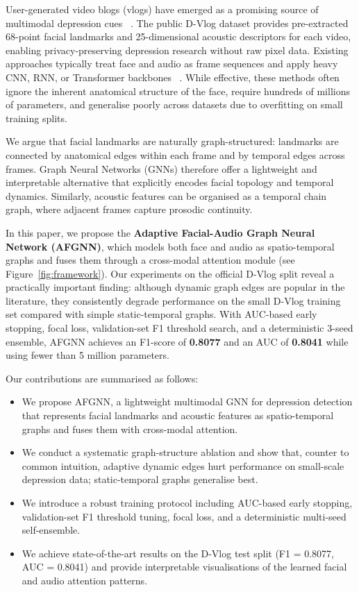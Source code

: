 \documentclass[conference]{IEEEtran}
\begin{document}
User-generated video blogs (vlogs) have emerged as a promising source of multimodal depression cues~
\cite{yoon2022dvlog}.
The public D-Vlog dataset provides pre-extracted 68-point facial landmarks and 25-dimensional acoustic descriptors for each video, enabling privacy-preserving depression research without raw pixel data.
Existing approaches typically treat face and audio as frame sequences and apply heavy CNN, RNN, or Transformer backbones~
\cite{zhou2023tamfn,tao2024depmstat,hua2026asym}.
While effective, these methods often ignore the inherent anatomical structure of the face, require hundreds of millions of parameters, and generalise poorly across datasets due to overfitting on small training splits.

We argue that facial landmarks are naturally graph-structured: landmarks are connected by anatomical edges within each frame and by temporal edges across frames.
Graph Neural Networks (GNNs) therefore offer a lightweight and interpretable alternative that explicitly encodes facial topology and temporal dynamics.
Similarly, acoustic features can be organised as a temporal chain graph, where adjacent frames capture prosodic continuity.

In this paper, we propose the \textbf{Adaptive Facial-Audio Graph Neural Network (AFGNN)}, which models both face and audio as spatio-temporal graphs and fuses them through a cross-modal attention module (see Figure~\ref{fig:framework}).
Our experiments on the official D-Vlog split reveal a practically important finding: although dynamic graph edges are popular in the literature, they consistently degrade performance on the small D-Vlog training set compared with simple static-temporal graphs.
With AUC-based early stopping, focal loss, validation-set F1 threshold search, and a deterministic 3-seed ensemble, AFGNN achieves an F1-score of \textbf{0.8077} and an AUC of \textbf{0.8041} while using fewer than 5 million parameters.

Our contributions are summarised as follows:
\begin{itemize}
    \item We propose AFGNN, a lightweight multimodal GNN for depression detection that represents facial landmarks and acoustic features as spatio-temporal graphs and fuses them with cross-modal attention.
    \item We conduct a systematic graph-structure ablation and show that, counter to common intuition, adaptive dynamic edges hurt performance on small-scale depression data; static-temporal graphs generalise best.
    \item We introduce a robust training protocol including AUC-based early stopping, validation-set F1 threshold tuning, focal loss, and a deterministic multi-seed self-ensemble.
    \item We achieve state-of-the-art results on the D-Vlog test split (F1 = 0.8077, AUC = 0.8041) and provide interpretable visualisations of the learned facial and audio attention patterns.
\end{itemize}
\end{document}
